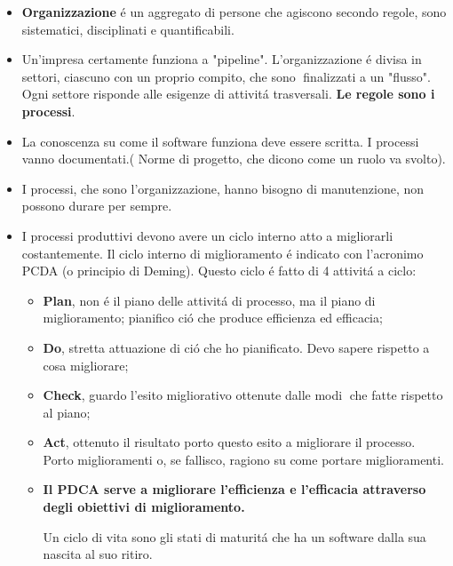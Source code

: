 \documentclass[a4paper,10pt] {article}
\begin{document}
\begin{itemize}
	\item \textbf{Organizzazione} \'e un aggregato di persone che 
	agiscono secondo regole, sono sistematici, disciplinati e
	quantificabili. 
	
	\item Un'impresa certamente funziona a "pipeline". L'organizzazione \'e 
	divisa in settori, ciascuno con un proprio compito, che sono finalizzati a 
	un 
"flusso". Ogni settore risponde alle esigenze di attivit\'a 
	trasversali. \textbf{Le regole sono i processi}. 
	
	\item La conoscenza su come il software funziona deve essere scritta. I 
	processi vanno documentati.( Norme di progetto, che dicono come un ruolo va 
	svolto).

	\item I processi, che sono l'organizzazione, hanno bisogno di manutenzione, 
	non possono durare per sempre.
	 
	\item I processi produttivi devono avere un ciclo interno atto a 
	migliorarli 
	costantemente. Il ciclo interno di miglioramento \'e indicato con 
	l'acronimo 
	PCDA (o principio di Deming). 
	Questo ciclo \'e fatto di 4 attivit\'a a ciclo:
	\begin{itemize}
		\item \textbf{Plan}, non \'e il piano delle attivit\'a di processo, ma 
		il
		piano di miglioramento; pianifico ci\'o che produce
		efficienza ed efficacia;
		
		\item \textbf{Do}, stretta attuazione di ci\'o che ho pianificato. Devo 
		sapere rispetto a cosa migliorare;
		
		\item \textbf{Check}, guardo l'esito migliorativo ottenute dalle modi
		che fatte rispetto al piano;
		
		\item \textbf{Act}, ottenuto il risultato porto questo esito a 
		migliorare il processo. 
		Porto miglioramenti o, se fallisco, ragiono su come portare 
		miglioramenti.
		
		
		\item \textbf{Il PDCA serve a migliorare l'efficienza e l'efficacia 
		attraverso degli obiettivi di miglioramento.}
		
		Un ciclo di vita sono gli stati di maturit\'a che ha un software dalla 
		sua nascita al suo ritiro.
		
	\end{itemize}


\end{itemize}
\end{document}
